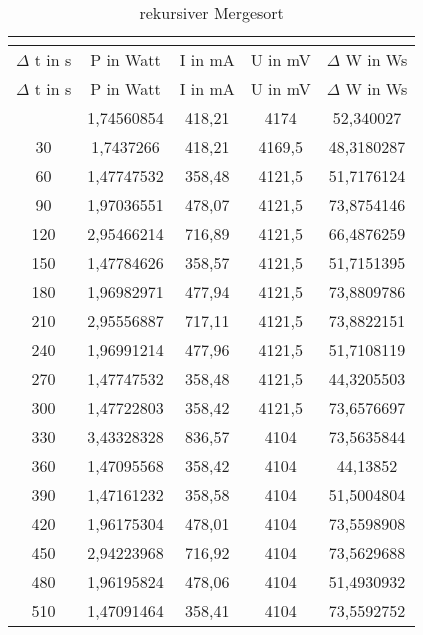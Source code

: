 
\begin{longtable}[c]{ccccc}
\caption{rekursiver Mergesort} \\
\label{tab:MergeSortMessungRekursive}\\
\hline
{$\Delta$ t in s} & {P in Watt} & {I in mA} & {U in mV} & {$\Delta$ W in Ws} \\
\hline
\endfirsthead
\hline
$\Delta$ t in s & P in Watt & I in mA & U in mV & $\Delta$ W in Ws \\
\hline
\endhead
\hline
\endfoot
\hline
      \midrule
    0     & 1,74560854 & 418,21 & 4174  & 52,340027 \\
    \midrule
    30    & 1,7437266 & 418,21 & 4169,5 & 48,3180287 \\
    \midrule
    60    & 1,47747532 & 358,48 & 4121,5 & 51,7176124 \\
    \midrule
    90    & 1,97036551 & 478,07 & 4121,5 & 73,8754146 \\
    \midrule
    120   & 2,95466214 & 716,89 & 4121,5 & 66,4876259 \\
    \midrule
    150   & 1,47784626 & 358,57 & 4121,5 & 51,7151395 \\
    \midrule
    180   & 1,96982971 & 477,94 & 4121,5 & 73,8809786 \\
    \midrule
    210   & 2,95556887 & 717,11 & 4121,5 & 73,8822151 \\
    \midrule
    240   & 1,96991214 & 477,96 & 4121,5 & 51,7108119 \\
    \midrule
    270   & 1,47747532 & 358,48 & 4121,5 & 44,3205503 \\
    \midrule
    300   & 1,47722803 & 358,42 & 4121,5 & 73,6576697 \\
    \midrule
    330   & 3,43328328 & 836,57 & 4104  & 73,5635844 \\
    \midrule
    360   & 1,47095568 & 358,42 & 4104  & 44,13852 \\
    \midrule
    390   & 1,47161232 & 358,58 & 4104  & 51,5004804 \\
    \midrule
    420   & 1,96175304 & 478,01 & 4104  & 73,5598908 \\
    \midrule
    450   & 2,94223968 & 716,92 & 4104  & 73,5629688 \\
    \midrule
    480   & 1,96195824 & 478,06 & 4104  & 51,4930932 \\
    \midrule
    510   & 1,47091464 & 358,41 & 4104  & 73,5592752 \\
    \midrule

\end{longtable}
